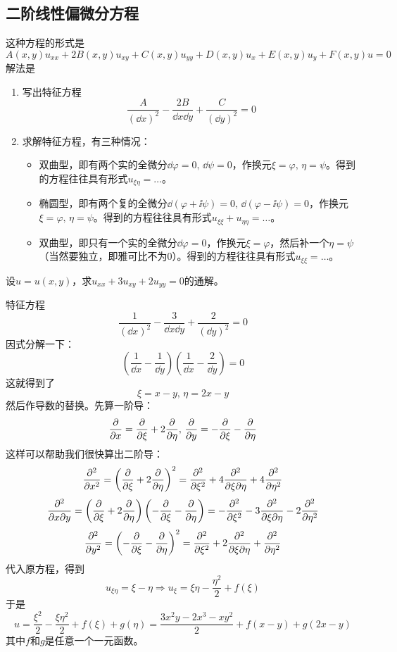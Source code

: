 \subsection{二阶线性偏微分方程}
这种方程的形式是
\[A(x, y) u_{xx} + 2 B(x, y) u_{xy} + C(x, y) u_{yy} + D(x, y) u_x + E(x, y) u_y + F(x, y) u = 0\]
解法是
\begin{enumerate}
    \item 写出\color{red}特征方程
        \[\frac{A}{\left(\dd{x}\right)^2} - \frac{2B}{\dd{x}\dd{y}} + \frac{C}{\left(\dd{y}\right)^2} = 0\]
        \color{black}
    \item 求解特征方程，有三种情况：
        \begin{itemize}
            \item 双曲型，即有两个实的全微分$\dd{\varphi} = 0,\, \dd{\psi} = 0$，作换元$\xi = \varphi,\, \eta = \psi$。得到的方程往往具有形式$u_{\xi \eta} = \dots$。
            \item 椭圆型，即有两个复的全微分$\dd{(\varphi + \ii \psi)} = 0,\, \dd{(\varphi - \ii \psi)} = 0$，作换元$\xi = \varphi,\, \eta = \psi$。得到的方程往往具有形式$u_{\xi \xi} + u_{\eta \eta} = \dots$。
            \item 双曲型，即只有一个实的全微分$\dd{\varphi} = 0$，作换元$\xi = \varphi$，然后补一个$\eta = \psi$（当然要独立，即雅可比不为0）。得到的方程往往具有形式$u_{\xi \xi} = \dots$。
        \end{itemize}
\end{enumerate}
\begin{problembox}
    \begin{example}
        设$u = u(x, y)$，求$u_{xx} + 3u_{xy} + 2u_{yy} = 0$的通解。
    \end{example}
    \begin{solution}
        特征方程
        \[\frac{1}{\left(\dd{x}\right)^2} - \frac{3}{\dd{x}\dd{y}} + \frac{2}{\left(\dd{y}\right)^2} = 0\]
        因式分解一下：
        \[\left(\frac{1}{\dd{x}} - \frac{1}{\dd{y}}\right)\left(\frac{1}{\dd{x}} - \frac{2}{\dd{y}}\right) = 0\]
        这就得到了
        \[\xi = x - y,\, \eta = 2x - y\]
        然后作导数的替换。先算一阶导：
        \[\pdv{}{x} = \pdv{}{\xi} + 2\pdv{}{\eta},\, \pdv{}{y} = -\pdv{}{\xi} - \pdv{}{\eta}\]
        这样可以帮助我们很快算出二阶导：
        \[\pdv[2]{}{x} = \left(\pdv{}{\xi} + 2\pdv{}{\eta}\right)^2 = \pdv[2]{}{\xi} + 4\pdv{}{\xi}{\eta} + 4\pdv[2]{}{\eta}\]
        \[\pdv{}{x}{y} = \left(\pdv{}{\xi} + 2\pdv{}{\eta}\right)\left(-\pdv{}{\xi} - \pdv{}{\eta}\right) = -\pdv[2]{}{\xi} - 3\pdv{}{\xi}{\eta} - 2 \pdv[2]{}{\eta}\]
        \[\pdv[2]{}{y} = \left(-\pdv{}{\xi} - \pdv{}{\eta}\right)^2 = \pdv[2]{}{\xi} + 2 \pdv{}{\xi}{\eta} + \pdv[2]{}{\eta}\]   
        代入原方程，得到
        \[u_{\xi \eta} = \xi - \eta \Rightarrow u_\xi = \xi \eta - \frac{\eta^2}{2} + f\left(\xi\right)\]
        于是
        \[u = \frac{\xi^2}{2} - \frac{\xi \eta^2}{2} + f(\xi) + g(\eta) = \frac{3 x^2 y - 2 x^3 - x y^2}{2} + f(x - y) + g(2x - y)\]     
        其中$f$和$g$是任意一个一元函数。
    \end{solution}
\end{problembox}
